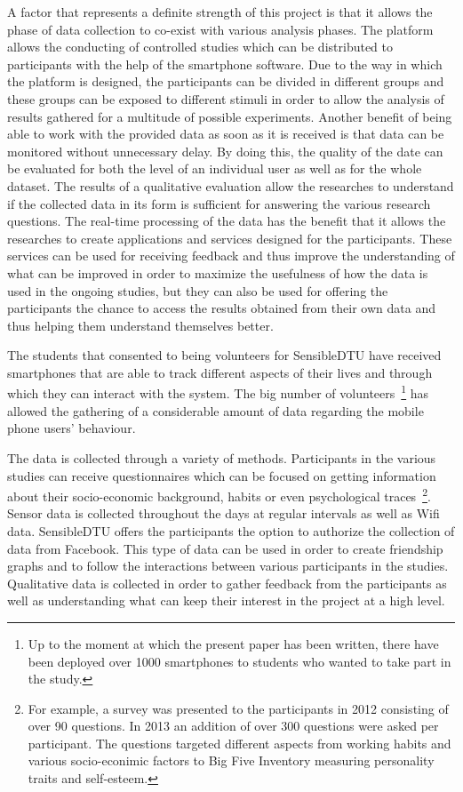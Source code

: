 A factor that represents a definite strength of this project is that it allows
the phase of data collection to co-exist with various analysis phases. The
platform allows the conducting of controlled studies which can be distributed to
participants with the help of the smartphone software. Due to the way in which
the platform is designed, the participants can be divided in different groups
and these groups can be exposed to different stimuli in order to allow the
analysis of results gathered for a multitude of possible experiments. Another
benefit of being able to work with the provided data as soon as it is received
is that data can be monitored without unnecessary delay. By doing this, the
quality of the date can be evaluated for both the level of an individual user as
well as for the whole dataset. The results of a qualitative evaluation allow the
researches to understand if the collected data in its form is sufficient for
answering the various research questions. The real-time processing of the data
has the benefit that it allows the researches to create applications and
services designed for the participants. These services can be used for receiving
feedback and thus improve the understanding of what can be improved in order to
maximize the usefulness of how the data is used in the ongoing studies, but they
can also be used for offering the participants the chance to access the results
obtained from their own data and thus helping them understand themselves better.

The students that consented to being volunteers for SensibleDTU have received
smartphones that are able to track different aspects of their lives and through
which they can interact with the system. The big number of
volunteers~\footnote{Up to the moment at which the present paper has been
written, there have been deployed over 1000 smartphones to students who wanted
to take part in the study.} has allowed the gathering of a considerable amount
of data regarding the mobile phone users' behaviour. 

The data is collected through a variety of methods. Participants in the various
studies can receive questionnaires which can be focused on getting information
about their socio-economic background, habits or even psychological
traces~\footnote{For example, a survey was presented to the participants in 2012
consisting of over 90 questions. In 2013 an addition of over 300 questions were
asked per participant. The questions targeted different aspects from working
habits and various socio-econimic factors to Big Five Inventory measuring
personality traits \cite{John99} and self-esteem.}. Sensor data is collected
throughout the days at regular intervals as well as Wifi data. SensibleDTU
offers the participants the option to authorize the collection of data from
Facebook. This type of data can be used in order to create friendship graphs and
to follow the interactions between various participants in the studies.
Qualitative data is collected in order to gather feedback from the participants
as well as understanding what can keep their interest in the project at a high
level.


